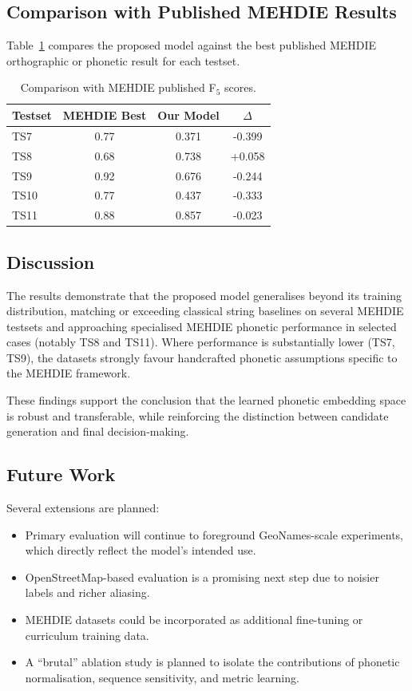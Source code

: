 \subsection{Comparison with Published MEHDIE Results}

Table~\ref{tab:mehdie_comparison} compares the proposed model against the best published MEHDIE
orthographic or phonetic result for each testset.

\begin{table}[h]
\centering
\begin{tabular}{lccc}
\hline
Testset & MEHDIE Best & Our Model & $\Delta$ \\
\hline
TS7 & 0.77 & 0.371 & -0.399 \\
TS8 & 0.68 & 0.738 & +0.058 \\
TS9 & 0.92 & 0.676 & -0.244 \\
TS10 & 0.77 & 0.437 & -0.333 \\
TS11 & 0.88 & 0.857 & -0.023 \\
\hline
\end{tabular}
\caption{Comparison with MEHDIE published F$_5$ scores.}
\label{tab:mehdie_comparison}
\end{table}

\subsection{Discussion}

The results demonstrate that the proposed model generalises beyond its training distribution,
matching or exceeding classical string baselines on several MEHDIE testsets and approaching
specialised MEHDIE phonetic performance in selected cases (notably TS8 and TS11).
Where performance is substantially lower (TS7, TS9), the datasets strongly favour handcrafted
phonetic assumptions specific to the MEHDIE framework.

These findings support the conclusion that the learned phonetic embedding space is robust and
transferable, while reinforcing the distinction between candidate generation and final decision-making.

\subsection{Future Work}

Several extensions are planned:
\begin{itemize}
  \item Primary evaluation will continue to foreground GeoNames-scale experiments, which directly
        reflect the model’s intended use.
  \item OpenStreetMap-based evaluation is a promising next step due to noisier labels and richer aliasing.
  \item MEHDIE datasets could be incorporated as additional fine-tuning or curriculum training data.
  \item A ``brutal'' ablation study is planned to isolate the contributions of phonetic normalisation,
        sequence sensitivity, and metric learning.
\end{itemize}